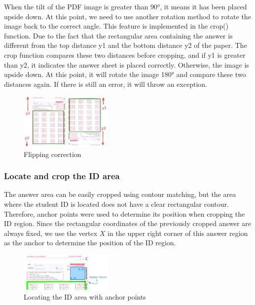 \documentclass[twocolumn]{article}
\begin{document}
        When the tilt of the PDF image is greater than 90°, it means it has been placed upside down. At this point, we need to use another rotation method to rotate the image back to the correct angle. This feature is implemented in the crop() function. Due to the fact that the rectangular area containing the answer is different from the top distance y1 and the bottom distance y2 of the paper. The crop function compares these two distances before cropping, and if y1 is greater than y2, it indicates the answer sheet is placed correctly. Otherwise, the image is upside down. At this point, it will rotate the image 180° and compare these two distances again. If there is still an error, it will throw an exception.

        \begin{figure}
            \centering
            \includegraphics[width=0.4\textwidth]{ans_flip.png}
            \caption{Flipping correction}
            \label{fig:ans_flip}
        \end{figure}

        \subsubsection{Locate and crop the ID area}
        The answer area can be easily cropped using contour matching, but the area where the student ID is located does not have a clear rectangular contour. Therefore, anchor points were used to determine its position when cropping the ID region. Since the rectangular coordinates of the previously cropped answer are always fixed, we use the vertex $X$ in the upper right corner of this answer region as the anchor to determine the position of the ID region.


        \begin{figure}[ht]
            \centering
            \includegraphics[width=0.4\textwidth]{locate_id.png}
            \caption{Locating the ID area with anchor points}
            \label{fig:locate_id}
        \end{figure}
\end{document}
